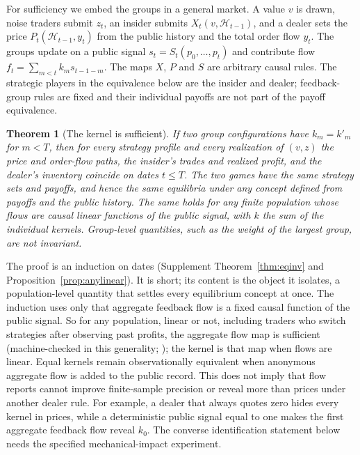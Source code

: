 \documentclass[12pt]{article}
\newtheorem{theorem}{Theorem}[section]
\theoremstyle{definition}
\theoremstyle{remark}
\begin{document}
For sufficiency we embed the groups in a general market. A value $v$ is drawn, noise traders submit $z_t$, an insider submits $X_t(v,\mathcal H_{t-1})$, and a dealer sets the price $P_t(\mathcal H_{t-1},y_t)$ from the public history and the total order flow $y_t$. The groups update on a public signal $s_t=S_t(p_0,\ldots,p_t)$ and contribute flow $f_t=\sum_{m<t}k_ms_{t-1-m}$. The maps $X$, $P$ and $S$ are arbitrary causal rules. The strategic players in the equivalence below are the insider and dealer; feedback-group rules are fixed and their individual payoffs are not part of the payoff equivalence.

\begin{theorem}[The kernel is sufficient]\label{n:suff}
If two group configurations have $k_m=k'_m$ for $m<T$, then for every strategy profile and every realization of $(v,z)$ the price and order-flow paths, the insider's trades and realized profit, and the dealer's inventory coincide on dates $t\le T$. The two games have the same strategy sets and payoffs, and hence the same equilibria under any concept defined from payoffs and the public history. The same holds for any finite population whose flows are causal linear functions of the public signal, with $k$ the sum of the individual kernels. Group-level quantities, such as the weight of the largest group, are not invariant.
\end{theorem}

The proof is an induction on dates (Supplement Theorem~\ref{thm:eqinv} and Proposition~\ref{prop:anylinear}). It is short; its content is the object it isolates, a population-level quantity that settles every equilibrium concept at once. The induction uses only that aggregate feedback flow is a fixed causal function of the public signal. So for any population, linear or not, including traders who switch strategies after observing past profits, the aggregate flow map is sufficient (machine-checked in this generality; \citealp[Theorem~S6.1]{niroula2026full}); the kernel is that map when flows are linear. Equal kernels remain observationally equivalent when anonymous aggregate flow is added to the public record. This does not imply that flow reports cannot improve finite-sample precision or reveal more than prices under another dealer rule. For example, a dealer that always quotes zero hides every kernel in prices, while a deterministic public signal equal to one makes the first aggregate feedback flow reveal $k_0$. The converse identification statement below needs the specified mechanical-impact experiment.
\end{document}
